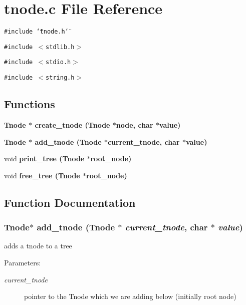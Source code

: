 \section{tnode.c File Reference}
\label{tnode_8c}
{\tt \#include \char`\"{}tnode.h\char`\"{}}\par
{\tt \#include $<$stdlib.h$>$}\par
{\tt \#include $<$stdio.h$>$}\par
{\tt \#include $<$string.h$>$}\par
\subsection*{Functions}
\begin{CompactItemize}
\item 
\bf{Tnode} $\ast$ \bf{create\_\-tnode} (\bf{Tnode} $\ast$node, char $\ast$value)
\item 
\bf{Tnode} $\ast$ \bf{add\_\-tnode} (\bf{Tnode} $\ast$current\_\-tnode, char $\ast$value)
\item 
void \bf{print\_\-tree} (\bf{Tnode} $\ast$root\_\-node)
\item 
void \bf{free\_\-tree} (\bf{Tnode} $\ast$root\_\-node)
\end{CompactItemize}


\subsection{Function Documentation}
\subsubsection{\setlength{\rightskip}{0pt plus 5cm}\bf{Tnode}$\ast$ add\_\-tnode (\bf{Tnode} $\ast$ {\em current\_\-tnode}, char $\ast$ {\em value})}\label{tnode_8c_0e09ab427d9f10182d2261a14b349f66}


adds a tnode to a tree \begin{Desc}
\item[Parameters:]
\begin{description}
\item[{\em current\_\-tnode}]pointer to the Tnode which we are adding below (initially root node) \end{description}
\end{Desc}
